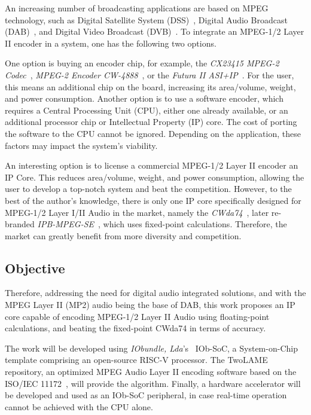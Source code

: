 An increasing number of broadcasting applications are based on MPEG technology,
such as Digital Satellite System (DSS)~\cite{dss}, Digital Audio Broadcast
(DAB)~\cite{dab}, and Digital Video Broadcast (DVB)~\cite{dvb}. To integrate an
MPEG-1/2 Layer II encoder in a system, one has the following two options.

One option is buying an encoder chip, for example, the \textit{CX23415 MPEG-2
  Codec}~\cite{cx23415}, \textit{MPEG-2 Encoder CW-4888}~\cite{cw4888}, or the
\textit{Futura II ASI+IP}~\cite{futura}. For the user, this means an additional
chip on the board, increasing its area/volume, weight, and power
consumption. Another option is to use a software encoder, which requires a
Central Processing Unit (CPU), either one already available, or an additional
processor chip or Intellectual Property (IP) core. The cost of porting the
software to the CPU cannot be ignored. Depending on the application, these
factors may impact the system's viability.

An interesting option is to license a commercial MPEG-1/2 Layer II encoder an IP
Core. This reduces area/volume, weight, and power consumption, allowing the user
to develop a top-notch system and beat the competition. However, to the best of
the author's knowledge, there is only one IP core specifically designed for
MPEG-1/2 Layer I/II Audio in the market, namely the \textit{CWda74}~\cite{CWda74},
later re-branded \textit{IPB-MPEG-SE}~\cite{ipb-mpeg-se}, which uses fixed-point
calculations. Therefore, the market can greatly benefit from more diversity and
competition.

\subsection{Objective}

Therefore, addressing the need for digital audio integrated solutions, and with
the MPEG Layer II (MP2) audio being the base of DAB, this work proposes an IP
core capable of encoding MPEG-1/2 Layer II Audio using floating-point
calculations, and beating the fixed-point CWda74 in terms of accuracy.

The work will be developed using \textit{IObundle, Lda}'s~\cite{iobundle}
IOb-SoC, a System-on-Chip template comprising an open-source RISC-V
processor. The TwoLAME~\cite{twolame} repository, an optimized MPEG Audio Layer
II encoding software based on the ISO/IEC 11172~\cite{11172}, will provide the
algorithm. Finally, a hardware accelerator will be developed and used as an
IOb-SoC peripheral, in case real-time operation cannot be achieved with the CPU
alone.

